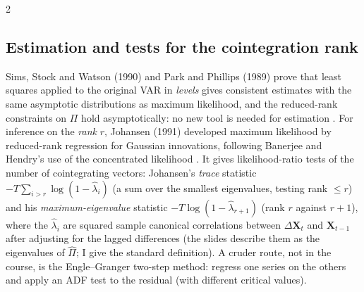 \begin{paracol}{2}
\subsection{Estimation and tests for the cointegration rank}\label{ch09:sec-cointest}
Sims, Stock and Watson (1990) and Park and Phillips (1989) prove that least squares applied to the original VAR in \emph{levels}
gives consistent estimates with the same asymptotic distributions as maximum likelihood, and the reduced-rank constraints on $\Pi$ hold
asymptotically: no new tool is needed for estimation . For inference on the \emph{rank}
$r$, Johansen (1991) developed maximum likelihood by reduced-rank regression for Gaussian innovations, following Banerjee and Hendry's use of the
concentrated likelihood . It gives likelihood-ratio tests of the number of cointegrating vectors: Johansen's \emph{trace} statistic
$-T\sum_{i>r}\log(1-\hat\lambda_i)$ (a sum over the smallest eigenvalues, testing rank $\le r$) and his \emph{maximum-eigenvalue} statistic
$-T\log(1-\hat\lambda_{r+1})$ (rank $r$ against $r+1$), where the $\hat\lambda_i$ are squared sample canonical correlations between
$\Delta\bm X_t$ and $\bm X_{t-1}$ after adjusting for the lagged differences (the slides describe them as the eigenvalues of $\hat\Pi$; I give the standard
definition). A cruder route, not in the course, is the Engle--Granger two-step method: regress one series on the others and apply an ADF test
to the residual (with different critical values).


\end{paracol}
